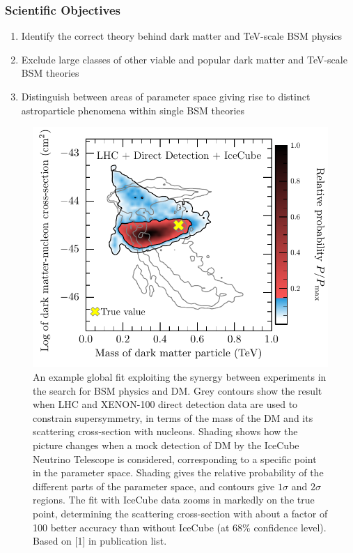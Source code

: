 \documentclass[11pt,oneside,twocolumn,a4paper]{article}
\begin{document}
\subsubsection*{Scientific Objectives}
\begin{enumerate}
\setlength{\itemsep}{2pt}
\item Identify the correct theory behind dark matter and TeV-scale BSM physics
\item Exclude large classes of other viable and popular dark matter and TeV-scale BSM theories
\item Distinguish between areas of parameter space giving rise to distinct astroparticle phenomena within single BSM theories
\end{enumerate}

\begin{figure}[t!]
  \centering
  \includegraphics[width=0.93\linewidth]{URF_Proposal_Fig_1}
  \caption{An example global fit exploiting the synergy between experiments in the search for BSM physics and DM.  Grey contours show the result when LHC and XENON-100 direct detection data are used to constrain supersymmetry, in terms of the mass of the DM and its scattering cross-section with nucleons.  Shading shows how the picture changes when a mock detection of DM by the IceCube Neutrino Telescope is considered, corresponding to a specific point in the parameter space.  Shading gives the relative probability of the different parts of the parameter space, and contours give $1\sigma$ and $2\sigma$ regions.  The fit with IceCube data zooms in markedly on the true point, determining the scattering cross-section with about a factor of 100 better accuracy than without IceCube (at 68\% confidence level).  Based on [1] in publication list.}
  \vspace{-6mm}
  \label{example}
\end{figure}
\end{document}
